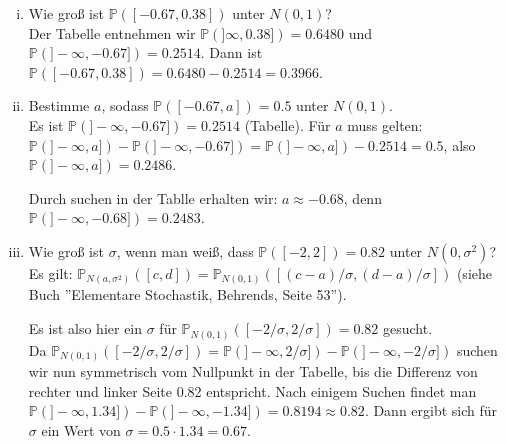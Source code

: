 \documentclass[11pt,a4paper,ngerman]{article}
\newcommand{\Prob}{\mathbb{P}}
\begin{document}
\begin{enumerate}[i)]
\item Wie groß ist $\Prob([-0.67,0.38])$ unter $N(0,1)$? \\
Der Tabelle entnehmen wir $\Prob(]\infty, 0.38]) =0.6480 $ und $\Prob(]-\infty,-0.67]) =  0.2514$.
Dann ist  $\Prob([-0.67,0.38]) = 0.6480 -  0.2514 = 0.3966$.
\item Bestimme $a$, sodass $\Prob([-0.67, a]) = 0.5$ unter $N(0,1)$.\\
Es ist   $\Prob(]-\infty,-0.67]) =  0.2514$ (Tabelle). Für $a$ muss gelten: \\
$\Prob(]-\infty, a]) - \Prob(]-\infty,-0.67])  = \Prob(]-\infty, a]) -  0.2514=  0.5$, also $\Prob(]-\infty, a]) = 0.2486$.

Durch suchen in der Tablle erhalten wir: $a \approx -0.68$, denn $\Prob(]-\infty,-0.68]) =  0.2483$.

\item Wie groß ist $\sigma$, wenn man weiß, dass $\Prob([-2,2]) = 0.82$ unter $N(0,\sigma^2)$?\\
Es gilt: $\Prob_{N(a,\sigma^2)}([c,d]) = \Prob_{N(0,1)}([(c-a)/\sigma, (d-a)/ \sigma])$  (siehe Buch ''Elementare Stochastik, Behrends, Seite 53'').

Es ist also hier ein $\sigma$ für $\Prob_{N(0,1)}([-2/\sigma, 2/ \sigma]) = 0.82$ gesucht. \\
Da  $\Prob_{N(0,1)}([-2/\sigma, 2/ \sigma]) =   \Prob(]-\infty, 2/ \sigma]) -  \Prob(]-\infty, - 2/ \sigma])$ suchen wir nun symmetrisch vom Nullpunkt in der Tabelle,
bis die Differenz von rechter und linker Seite 0.82 entspricht. Nach einigem Suchen findet man  $\Prob(]-\infty, 1.34]) -  \Prob(]-\infty, -1.34]) = 0.8194 \approx 0.82$.
Dann ergibt sich für $\sigma$ ein Wert von $\sigma = 0.5 \cdot 1.34 = 0.67$.
\end{enumerate}


\label{LastPage}
\end{document}
